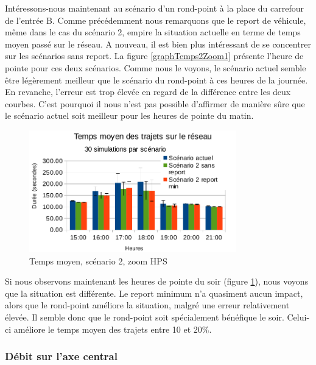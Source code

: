 \documentclass[a4paper,11pt, titlepage]{extarticle}
\begin{document}
Intéressons-nous maintenant au scénario d'un rond-point à la place du carrefour de l'entrée B. Comme précédemment nous remarquons que le report de véhicule, même dans le cas du scénario 2, empire la situation actuelle en terme de temps moyen passé sur le réseau. A nouveau, il est bien plus intéressant de se concentrer sur les scénarios sans report. La figure \ref{graphTemps2Zoom1} présente l'heure de pointe pour ces deux scénarios. Comme nous le voyons, le scénario actuel semble être légèrement meilleur que le scénario du rond-point à ces heures de la journée. En revanche, l'erreur est trop élevée en regard de la différence entre les deux courbes. C'est pourquoi il nous n'est pas possible d'affirmer de manière sûre que le scénario actuel soit meilleur pour les heures de pointe du matin.

\newpage

\begin{figure}
  \begin{center}
    \includegraphics[width=9cm]{graphiques/temps_scenario2_zoom2.png}
  \end{center}
  \caption{Temps moyen, scénario 2, zoom HPS}
  \label{graphTemps2Zoom2}
\end{figure}

Si nous observons maintenant les heures de pointe du soir (figure \ref{graphTemps2Zoom2}), nous voyons que la situation est différente. Le report minimum n'a quasiment aucun impact, alors que le rond-point améliore la situation, malgré une erreur relativement élevée. Il semble donc que le rond-point soit spécialement bénéfique le soir. Celui-ci améliore le temps moyen des trajets entre 10 et 20$\%$.

\vspace{2cm}

\subsubsection{Débit sur l'axe central}
\end{document}

